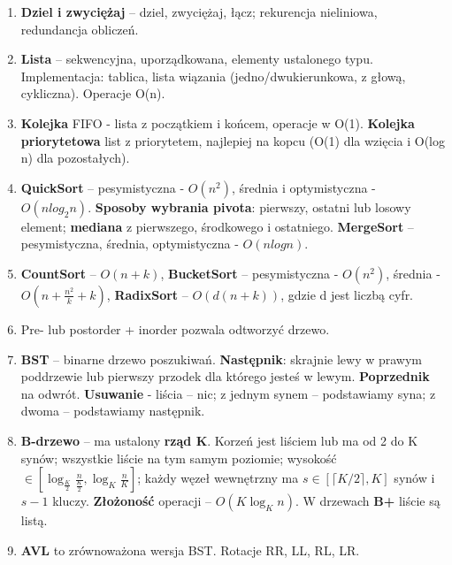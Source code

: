 \documentclass[12pt]{article}
\begin{document}
\begin{enumerate}
        \item \textbf{Dziel i zwyciężaj} -- dziel, zwyciężaj, łącz;
        rekurencja nieliniowa, redundancja obliczeń.

        \item \textbf{Lista} -- sekwencyjna, uporządkowana, elementy ustalonego typu.
        Implementacja: tablica, lista
        wiązania (jedno/dwukierunkowa, z głową, cykliczna).
        Operacje O(n).

        \item \textbf{Kolejka} FIFO - lista z początkiem i końcem, operacje w O(1). \textbf{Kolejka priorytetowa}
        list z priorytetem, najlepiej na kopcu (O(1) dla wzięcia i O(log n)  dla pozostałych).

        \item \textbf{QuickSort} -- pesymistyczna - $O(n^2)$, średnia i optymistyczna - $O(nlog_2 n)$.
        \textbf{Sposoby wybrania pivota}: pierwszy, ostatni lub losowy element; \textbf{mediana} z pierwszego,
        środkowego i ostatniego. \textbf{MergeSort} -- pesymistyczna, średnia, optymistyczna - $O(nlogn)$.

        \item \textbf{CountSort} -- $O(n+k)$, \textbf{BucketSort} -- pesymistyczna -  $O(n^2)$, średnia -
        $O\left(n + \frac{n^2}{k} + k\right)$, \textbf{RadixSort} -- $O(d(n+k))$, gdzie d jest liczbą cyfr.

        \item Pre- lub postorder + inorder pozwala odtworzyć drzewo.

        \item \textbf{BST} -- binarne drzewo poszukiwań. \textbf{Następnik}: skrajnie lewy w prawym poddrzewie lub pierwszy
        przodek dla którego jesteś w lewym. \textbf{Poprzednik} na odwrót. \textbf{Usuwanie} - liścia -- nic;
        z jednym
        synem -- podstawiamy syna;
        z dwoma -- podstawiamy następnik.

        \item \textbf{B-drzewo} -- ma ustalony \textbf{rząd K}.
        Korzeń jest liściem lub ma od 2 do K synów;
        wszystkie liście na tym samym poziomie;
        wysokość $\in [\log_{\frac{K}{2}} \frac{n}{\frac{K}{2}}, \log_{K} \frac{n}{K}]$;
        każdy węzeł wewnętrzny ma  $s \in [\lceil K/2 \rceil, K]$ synów i $s-1$ kluczy. \textbf{Złożoność}
        operacji -- $O(K \log_{K} n)$.
        W drzewach \textbf{B+} liście są listą.

        \item \textbf{AVL} to zrównoważona wersja BST. Rotacje RR, LL, RL, LR\@.


\end{enumerate}
\end{document}
